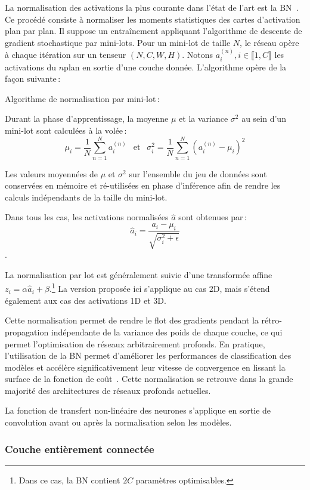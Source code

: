 La normalisation des activations la plus courante dans l'état de l'art est la \gls{BN}~\cite{ioffe_batch_2015}. Ce procédé consiste à normaliser les moments statistiques des cartes d'activation plan par plan. Il suppose un entraînement appliquant l'algorithme de descente de gradient stochastique par mini-lots. Pour un mini-lot de taille $N$, le réseau opère à chaque itération sur un tenseur $(N, C, W, H)$. Notons $a^{(n)}_i, i \in \llbracket 1,C \rrbracket$ les activations du $n$\ieme plan en sortie d'une couche donnée. L'algorithme opère de la façon suivante\,:
\begin{definition}
Algorithme de normalisation par mini-lot\,:

Durant la phase d'apprentissage, la moyenne $\mu$ et la variance $\sigma^2$ au sein d'un mini-lot sont calculées à la volée\,:
$$\mu_i = \frac{1}{N} \sum_{n=1}^N a_i^{(n)}~~\text{ et }~~\sigma^2_i = \frac{1}{N} \sum_{n=1}^N (a_i^{(n)} - \mu_i)^2$$

Les valeurs moyennées de $\mu$ et $\sigma^2$ sur l'ensemble du jeu de données sont conservées en mémoire et ré-utilisées en phase d'inférence afin de rendre les calculs indépendants de la taille du mini-lot.

Dans tous les cas, les activations normalisées $\hat{a}$ sont obtenues par\,:
$$\hat{a}_i = \frac{a_i - \mu_i}{\sqrt{\sigma_i^2 + \epsilon}}$$.
\end{definition}

La normalisation par lot est généralement suivie d'une transformée affine $z_i = \alpha \hat{a}_i + \beta$.\footnote{Dans ce cas, la \gls{BN} contient $2C$ paramètres optimisables.} La version proposée ici s'applique au cas 2D, mais s'étend également aux cas des activations 1D et 3D.

Cette normalisation permet de rendre le flot des gradients pendant la rétro-propagation indépendante de la variance des poids de chaque couche, ce qui permet l'optimisation de réseaux arbitrairement profonds. En pratique, l'utilisation de la \gls{BN} permet d'améliorer les performances de classification des modèles et accélère significativement leur vitesse de convergence en lissant la surface de la fonction de coût~\cite{santurkar_how_2018}. Cette normalisation se retrouve dans la grande majorité des architectures de réseaux profonds actuelles.

La fonction de transfert non-linéaire des neurones s'applique en sortie de convolution avant ou après la normalisation selon les modèles.

\subsubsection{Couche entièrement connectée}

